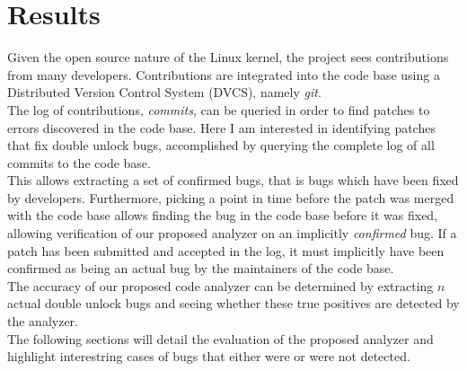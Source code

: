 \section{Results}

\noindent Given the open source nature of the Linux kernel, the project sees contributions from many developers. Contributions are integrated into the code base using a Distributed Version Control System (DVCS), namely \textit{git}. 
\\

\noindent The log of contributions, \textit{commits}, can be queried in order to find patches to errors discovered in the code base. Here I am interested in identifying patches that fix double unlock bugs, accomplished by querying the complete log of all commits to the code base. 
\\

\noindent This allows extracting a set of confirmed bugs, that is bugs which have been fixed by developers. Furthermore, picking a point in time before the patch was merged with the code base allows finding the bug in the code base before it was fixed, allowing verification of our proposed analyzer on an implicitly \textit{confirmed} bug. If a patch has been submitted and accepted in the log, it must implicitly have been confirmed as being an actual bug by the maintainers of the code base. 
\\

\noindent The accuracy of our proposed code analyzer can be determined by extracting $n$ actual double unlock bugs and seeing whether these true positives are detected by the analyzer. 
\\

\noindent The following sections will detail the evaluation of the proposed analyzer and highlight interestring cases of bugs that either were or were not detected. 
\\